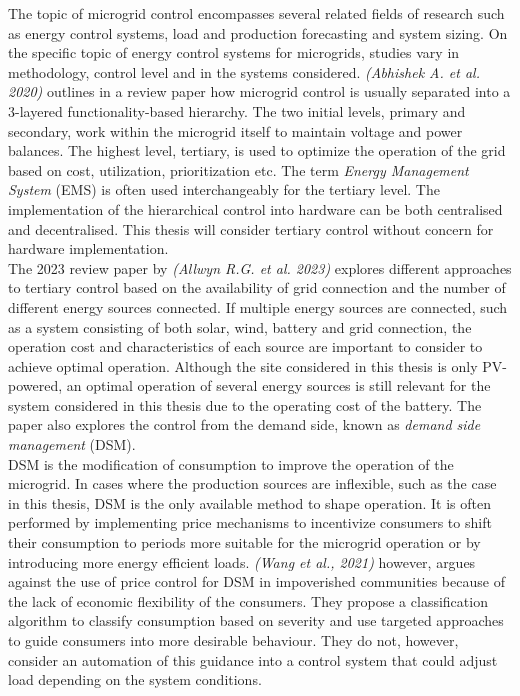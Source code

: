 The topic of microgrid control encompasses several related fields of research such as energy control systems, load and production forecasting and system sizing. On the specific topic of energy control systems for microgrids, studies vary in methodology, control level and in the systems considered. \textit{(Abhishek A. et al. 2020)} outlines in a review paper how microgrid control is usually separated into a 3-layered functionality-based hierarchy. The two initial levels, primary and secondary, work within the microgrid itself to maintain voltage and power balances. The highest level, tertiary, is used to optimize the operation of the grid based on cost, utilization, prioritization etc. The term \textit{Energy Management System} (EMS) is often used interchangeably for the tertiary level. The implementation of the hierarchical control into hardware can be both centralised and decentralised. This thesis will consider tertiary control without concern for hardware implementation.\cite{Abhishek2020-ox}\\

The 2023 review paper by \textit{(Allwyn R.G. et al. 2023)} explores different approaches to tertiary control based on the availability of grid connection and the number of different energy sources connected. If multiple energy sources are connected, such as a system consisting of both solar, wind, battery and grid connection, the operation cost and characteristics of each source are important to consider to achieve optimal operation. Although the site considered in this thesis is only PV-powered, an optimal operation of several energy sources is still relevant for the system considered in this thesis due to the operating cost of the battery. The paper also explores the control from the demand side, known as \textit{demand side management} (DSM).\cite{Allwyn2023-pd}\\

DSM is the modification of consumption to improve the operation of the microgrid. In cases where the production sources are inflexible, such as the case in this thesis, DSM is the only available method to shape operation. It is often performed by implementing price mechanisms to incentivize consumers to shift their consumption to periods more suitable for the microgrid operation\cite{Kanakadhurga2022-op} or by introducing more energy efficient loads\cite{Gilda2018-nh}. \textit{(Wang et al., 2021)} however, argues against the use of price control for DSM in impoverished communities because of the lack of economic flexibility of the consumers. They propose a classification algorithm to classify consumption based on severity and use targeted approaches to guide consumers into more desirable behaviour. They do not, however, consider an automation of this guidance into a control system that could adjust load depending on the system conditions.\cite{Wang2021-kb}\\

